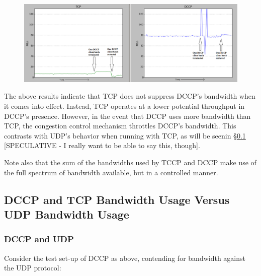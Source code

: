 \documentclass[10pt,a4paper]{article}
\begin{document}
\begin{figure}[!h]
\begin{center}
\hspace*{-65pt}
\includegraphics[scale=.52]{screens/re/Screenshot-2.png}
\end{center}
\end{figure}



The above results indicate that TCP does not suppress DCCP's bandwidth when it comes into effect. Instead, TCP operates
at a lower potential throughput in DCCP's presence. However,
in the event that DCCP uses more bandwidth than TCP, the congestion control mechanism throttles DCCP's
bandwidth. This contrasts with UDP's behavior when running with TCP, as will be seenin \S\ref{contention}
 [SPECULATIVE - I really want to be able to say this, though]. 

Note also that the sum of the bandwidths used by TCCP and DCCP make use of the full spectrum of bandwidth available,
but in a controlled manner.



\subsection{DCCP and TCP Bandwidth Usage Versus UDP Bandwidth Usage}
\label{contention}
\subsubsection{DCCP and UDP}
Consider the test set-up of DCCP as above, contending for bandwidth against the UDP
protocol:
\end{document}
